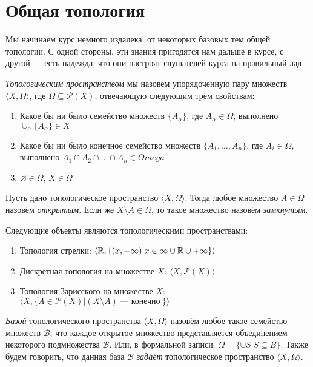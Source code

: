 \section{Общая топология}

Мы начинаем курс немного издалека: от некоторых базовых тем общей топологии.
С одной стороны, эти знания пригодятся нам дальше в курсе, с другой --- есть 
надежда, что они настроят слушателей курса на правильный лад.

\begin{definition} \emph{Топологическим пространством} мы назовём упорядоченную
пару множеств $\langle X, \Omega \rangle$, где $\Omega \subseteq {\mathcal{P}}(X)$,
отвечающую следующим трём свойствам:

\begin{enumerate}
\item Какое бы ни было семейство множеств $\{A_\alpha\}$, где $A_\alpha \in \Omega$, выполнено
$\cup_\alpha\{A_\alpha\} \in X$
\item Какое бы ни было конечное семейство множеств $\{A_1, \dots, A_n\}$, где $A_i \in \Omega$,
выполнено $A_1 \cap A_2 \cap \dots \cap A_n \in Omega$
\item $\varnothing \in \Omega$, $X \in \Omega$
\end{enumerate}
\end{definition}

\begin{definition} Пусть дано топологическое пространство $\langle X, \Omega \rangle$.
Тогда любое множество $A \in \Omega$ назовём \emph{открытым}. Если же $X \setminus A \in \Omega$, 
то такое множество назовём \emph{замкнутым}.
\end{definition}

\begin{theorem} Следующие объекты являются топологическими пространствами:
\begin{enumerate}
\item Топология стрелки: $\langle \mathbb{R}, \{(x,+\infty) | x \in {\-\infty}\cup\mathbb{R}\cup{+\infty}\} \rangle$
\item Дискретная топология на множестве $X$: $\langle X, {\mathcal{P}}(X) \rangle$
\item Топология Зарисского на множестве $X$: $\langle X, \{ A \in {\mathcal{P}}(X) | (X \setminus A) ~\textrm{--- конечно}~\} \rangle$
\end{enumerate}
\end{theorem}

\begin{definition} \emph{Базой} топологического пространства $\langle X, \Omega \rangle$ назовём
любое такое семейство множеств $\mathcal{B}$, что каждое открытое множество представляется
объединением некоторого подмножества $\mathcal{B}$. Или, в формальной записи,
$\Omega = \{\cup S | S \subseteq B\}$.
Также будем говорить, что данная база $\mathcal{B}$ \emph{задаёт} топологическое 
пространство $\langle X, \Omega \rangle$.
\end{definition}

